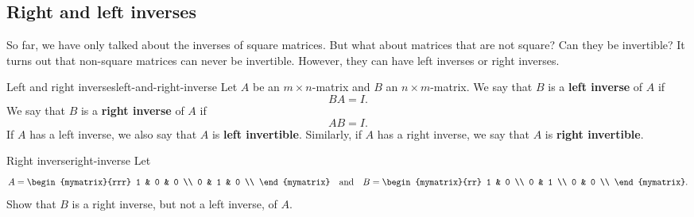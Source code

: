 \subsection{Right and left inverses}

So far, we have only talked about the inverses of square matrices. But
what about matrices that are not square? Can they be invertible? It
turns out that non-square matrices can never be invertible. However,
they can have left inverses or right inverses.

\begin{definition}{Left and right inverses}{left-and-right-inverse}
  Let $A$ be an $m\times n$-matrix and $B$ an $n\times m$-matrix.
  We say that $B$ is a \textbf{left inverse}%
   of
  $A$ if
  \begin{equation*}
    BA=I.
  \end{equation*}
  We say that $B$ is a \textbf{right inverse}%
   of
  $A$ if
  \begin{equation*}
    AB=I.
  \end{equation*}
  If $A$ has a left inverse, we also say that $A$ is
  \textbf{left invertible}. Similarly, if $A$ has a right inverse, we
  say that $A$ is \textbf{right invertible}.
\end{definition}

\begin{example}{Right inverse}{right-inverse}
  Let
  \begin{equation*}
    A = \begin{mymatrix}{rrr}
      1 & 0 & 0 \\
      0 & 1 & 0 \\
    \end{mymatrix}
    \quad\mbox{and}\quad
    B = \begin{mymatrix}{rr}
      1 & 0 \\
      0 & 1 \\
      0 & 0 \\
    \end{mymatrix}.
  \end{equation*}
  Show that $B$ is a right inverse, but not a left inverse, of $A$.
\end{example}

